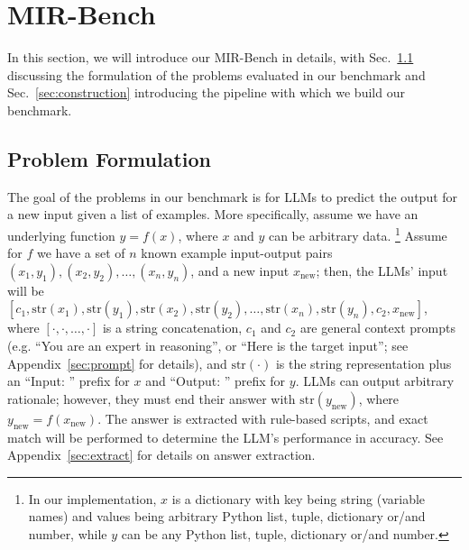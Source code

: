 \section{MIR-Bench}

In this section, we will introduce our MIR-Bench in details, with Sec.~\ref{sec:formulation} discussing the formulation of the problems evaluated in our benchmark and Sec.~\ref{sec:construction} introducing the pipeline with which we build our benchmark.

\subsection{Problem Formulation}
\label{sec:formulation}

The goal of the problems in our benchmark is for LLMs to predict the output for a new input given a list of examples. More specifically, assume we have an underlying function $y=f(x)$, where $x$ and $y$ can be arbitrary data. \footnote{In our implementation, $x$ is a dictionary with key being string (variable names) and values being arbitrary Python list, tuple, dictionary or/and number, while $y$ can be any Python list, tuple, dictionary or/and number.} 
Assume for $f$ we have a set of $n$ known example input-output pairs $(x_1, y_1), (x_2, y_2), \dots, (x_n, y_n)$, and a new input $x_{\text{new}}$; then, the LLMs' input will be $[c_1, \text{str}(x_1), \text{str}(y_1), \text{str}(x_2), \text{str}(y_2), \dots, \text{str}(x_n), \text{str}(y_n), c_2, x_{\text{new}}]$, where $[\cdot, \cdot, \dots, \cdot]$ is a string concatenation, $c_1$ and $c_2$ are general context prompts (e.g. ``You are an expert in reasoning'', or ``Here is the target input''; see Appendix~\ref{sec:prompt} for details), and $\text{str}(\cdot)$ is the string representation plus an ``Input: '' prefix for $x$ and ``Output: '' prefix for $y$. LLMs can output arbitrary rationale; however, they must end their answer with $\text{str}(y_{\text{new}})$, where $y_{\text{new}}=f(x_{\text{new}})$. The answer is extracted with rule-based scripts, and exact match will be performed to determine the LLM's performance in accuracy. See Appendix~\ref{sec:extract} for details on answer extraction.

